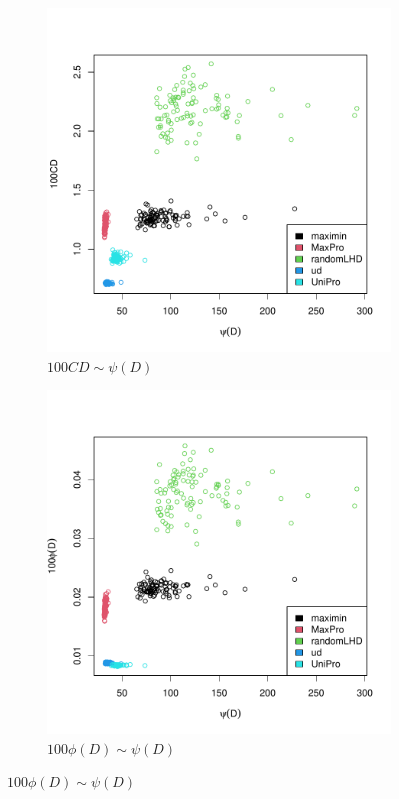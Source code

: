 \documentclass [PhD] {package/uclathes}
\begin{document}
\begin{figure}
\begin{adjustwidth}{-2cm}{-2cm}
\begin{subfigure}[b]{0.3\textwidth}
\end{subfigure}
\begin{subfigure}[b]{0.3\textwidth}
\centering
\caption{$100CD \sim \psi(D)$}
\includegraphics[width=\textwidth]{chapters/EGO/pdfs/psi_cd}
\end{subfigure}
\begin{subfigure}[b]{0.3\textwidth}
\centering
\caption{$100\phi(D)\sim \psi(D)$}
\includegraphics[width=\textwidth]{chapters/EGO/pdfs/psi_eta}

\end{subfigure}
\end{adjustwidth}
\end{figure}
\end{document}
